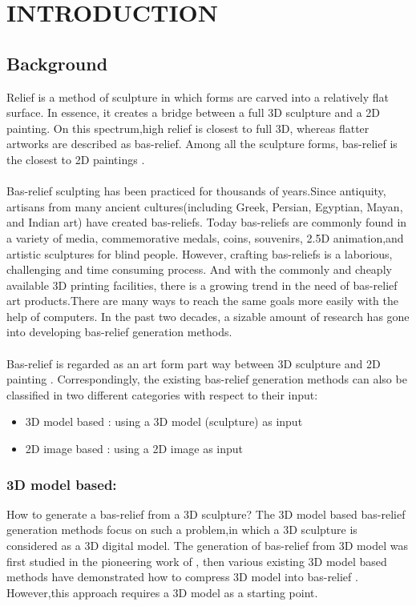 \chapter{INTRODUCTION}

\section{Background}
Relief is a method of sculpture in which forms are carved into a
relatively flat surface. In essence, it creates a bridge between a full 3D sculpture and a 2D painting. On this spectrum,high relief is closest to full 3D, whereas flatter artworks are described as bas-relief. Among all the sculpture forms, bas-relief is the closest to 2D paintings\cite{kerber2009feature} \cite{barron2012color}.\\ \\
Bas-relief sculpting has been practiced for thousands of years.Since antiquity, artisans from many ancient cultures(including Greek, Persian, Egyptian, Mayan, and Indian art) have created bas-reliefs.
Today bas-reliefs are commonly found in a variety of media, commemorative medals, coins, souvenirs, 2.5D animation,and artistic sculptures for blind people. However, crafting bas-reliefs is a laborious, challenging and time consuming process. And with the commonly and cheaply available 3D printing facilities, there is a growing trend in the need of bas-relief art products.There are many ways to reach the same goals more easily with the help of computers. In the past two decades, a sizable amount of research has gone into developing bas-relief generation methods\cite{benzaid2017analysis}.\\ \\ 
Bas-relief is regarded as an art form part way between 3D sculpture and 2D painting \cite{benzaid2017analysis}\cite{barron2012color}\cite{weyrich2007digital}\cite{kerber2009feature}\cite{kerber2012computer}. Correspondingly, the existing bas-relief generation methods can also be classified in two different categories with respect to their input\cite{benzaid2017analysis}:
\begin{itemize}
 \item 3D model based : using a 3D model (sculpture) as input 
 \item 2D image based : using a 2D image as input 
\end{itemize} 
\subsection{3D model based:} How to generate a bas-relief from a 3D sculpture? The 3D model based bas-relief generation methods focus on such a problem,in which a 3D sculpture is considered as a 3D digital model.   The generation of bas-relief from 3D model was first studied in the pioneering work of \cite{cignoni1997computer}, then various existing 3D model based methods have demonstrated how to compress 3D model into bas-relief \cite{weyrich2007digital}\cite{kerber2009feature}\cite{song2007automatic}\cite{sun2009bas} . However,this approach requires a 3D model as a starting point.
